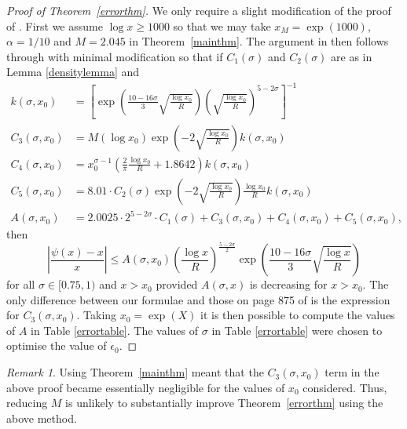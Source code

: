 \documentclass[reqno]{amsart}
\numberwithin{equation}{section}
\theoremstyle{remark}
\newtheorem*{remark}{Remark}
\begin{document}
\begin{proof}[Proof of Theorem~\ref{errorthm}]
    We only require a slight modification of the proof of \cite[Theorem 1]{P_T_2021}. First we assume $\log x\geq 1000$ so that we may take $x_M=\exp(1000)$, $\alpha=1/10$ and $M=2.045$ in Theorem~\ref{mainthm}. The argument in \cite[pp. 874--875]{P_T_2021} then follows through with minimal modification so that if $C_1(\sigma)$ and $C_2(\sigma)$ are as in Lemma \ref{densitylemma} and
    \begin{align*}
        k(\sigma,x_0)&=\left[\exp\left(\frac{10-16\sigma}{3}\sqrt{\frac{\log x_0}{R}}  \right)\left(\sqrt{\frac{\log x_0}{R}}\right)^{5-2\sigma}\right]^{-1}\\
        C_3(\sigma,x_0)&=M(\log x_0)\exp\left(-2\sqrt{\frac{\log x_0}{R}}\right)k(\sigma,x_0)\\
        C_4(\sigma,x_0)&=x_0^{\sigma-1}\left(\frac{2}{\pi}\frac{\log x_0}{R}+1.8642\right)k(\sigma,x_0)\\
        C_5(\sigma,x_0)&=8.01\cdot C_2(\sigma)\exp\left(-2\sqrt{\frac{\log x_0}{R}}\right)\frac{\log x_0}{R}k(\sigma,x_0)\\
        A(\sigma,x_0)&=2.0025\cdot 2^{5-2\sigma}\cdot C_1(\sigma)+C_3(\sigma,x_0)+C_4(\sigma,x_0)+C_5(\sigma,x_0),
    \end{align*}
    then
    \begin{equation*}
        \left|\frac{\psi(x)-x}{x}\right|\leq A(\sigma,x_0)\left(\frac{\log x}{R}\right)^{\frac{5-2\sigma}{2}}\exp\left(\frac{10-16\sigma}{3}\sqrt{\frac{\log x}{R}}\right)
    \end{equation*}
    for all $\sigma\in[0.75,1)$ and $x>x_0$ provided $A(\sigma,x)$ is decreasing for $x>x_0$. The only difference between our formulae and those on page 875 of \cite{P_T_2021} is the expression for $C_3(\sigma,x_0)$. Taking $x_0=\exp(X)$ it is then possible to compute the values of $A$ in Table \ref{errortable}. The values of $\sigma$ in Table \ref{errortable} were chosen to optimise the value of $\epsilon_0$.
\end{proof}
\begin{remark}
    Using Theorem~\ref{mainthm} meant that the $C_3(\sigma,x_0)$ term in the above proof became essentially negligible for the values of $x_0$ considered. Thus, reducing $M$ is unlikely to substantially improve Theorem~\ref{errorthm} using the above method.
\end{remark}
\end{document}
